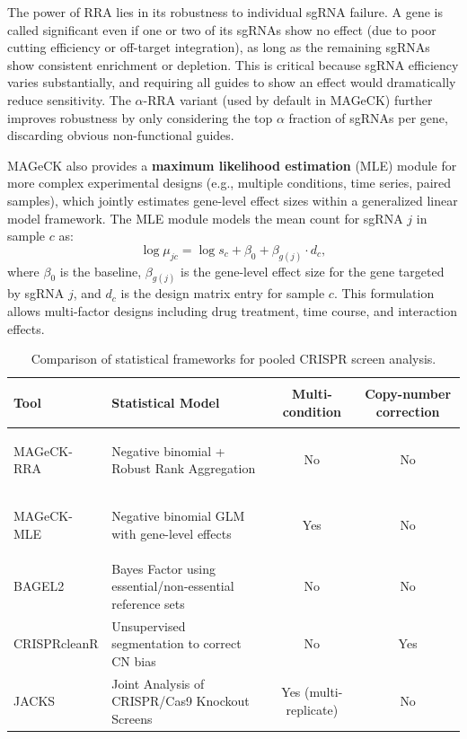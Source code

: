 \begin{keyconcept}[title={Why RRA Is Robust}]
The power of RRA lies in its robustness to individual sgRNA failure. A gene is called significant even if one or two of its sgRNAs show no effect (due to poor cutting efficiency or off-target integration), as long as the remaining sgRNAs show consistent enrichment or depletion. This is critical because sgRNA efficiency varies substantially, and requiring all guides to show an effect would dramatically reduce sensitivity. The $\alpha$-RRA variant (used by default in MAGeCK) further improves robustness by only considering the top $\alpha$ fraction of sgRNAs per gene, discarding obvious non-functional guides.
\end{keyconcept}

MAGeCK also provides a \textbf{maximum likelihood estimation} (MLE) module for more complex experimental designs (e.g., multiple conditions, time series, paired samples), which jointly estimates gene-level effect sizes within a generalized linear model framework. The MLE module models the mean count for sgRNA $j$ in sample $c$ as:
\begin{equation}
  \log \mu_{jc} = \log s_c + \beta_0 + \beta_{g(j)} \cdot d_c,
  \label{eq:specialized:mageck-mle}
\end{equation}
where $\beta_0$ is the baseline, $\beta_{g(j)}$ is the gene-level effect size for the gene targeted by sgRNA $j$, and $d_c$ is the design matrix entry for sample $c$. This formulation allows multi-factor designs including drug treatment, time course, and interaction effects.

\begin{table}[htbp]
\centering
\caption[Comparison of CRISPR screen analysis tools.]{Comparison of statistical frameworks for pooled CRISPR screen analysis.}
\label{tab:specialized:crispr-tools-comparison}
\small
\begin{tabularx}{\textwidth}{>{\bfseries\raggedright}p{2.0cm} X c c}
\toprule
\textbf{Tool} & \textbf{Statistical Model} & \textbf{Multi-condition} & \textbf{Copy-number correction} \\
\midrule
MAGeCK-RRA & Negative binomial + Robust Rank Aggregation & No & No \\
\addlinespace
MAGeCK-MLE & Negative binomial GLM with gene-level effects & Yes & No \\
\addlinespace
BAGEL2 & Bayes Factor using essential/non-essential reference sets & No & No \\
\addlinespace
CRISPRcleanR & Unsupervised segmentation to correct CN bias & No & Yes \\
\addlinespace
JACKS & Joint Analysis of CRISPR/Cas9 Knockout Screens & Yes (multi-replicate) & No \\
\bottomrule
\end{tabularx}
\end{table}

